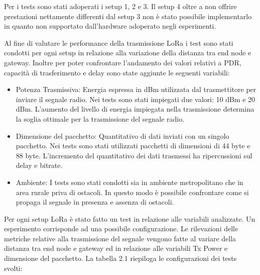 \documentclass[12pt,a4paper,openright,twoside]{report}
\begin{document}
Per i tests sono stati adoperati i setup 1, 2 e 3. Il setup 4 oltre a non offrire prestazioni nettamente differenti dal setup 3 non \`e stato possibile implementarlo in quanto non supportato dall'hardware adoperato negli esperimenti.  

Al fine di valutare le performance della trasmissione LoRa i test sono stati condotti per ogni setup in relazione alla variazione della distanza tra end node e gateway. Inoltre per poter confrontare l'andamento dei valori relativi a PDR, capacit\`a di trasferimento e delay sono state aggiunte le seguenti variabili:   
\begin{itemize}   
\item Potenza Trasmissiva: Energia espressa in dBm utilizzata dal trasmettitore per inviare il segnale radio. Nei tests sono stati impiegati due valori: 10 dBm e 20 dBm. L'aumento del livello di energia impiegata nella trasmissione determina la soglia ottimale per la trasmissione del segnale radio.     
\item Dimensione del pacchetto: Quantitativo di dati inviati con un singolo pacchetto. Nei tests sono stati utilizzati pacchetti di dimensioni di 44 byte e 88 byte. L'incremento del quantitativo dei dati trasmessi ha ripercussioni sul delay e bitrate.   
\item Ambiente: I tests sono stati condotti sia in ambiente metropolitano che in area rurale priva di ostacoli. In questo modo \`e possibile confrontare come si propaga il segnale in presenza e assenza di ostacoli. 
\end{itemize}

Per ogni setup LoRa \`e stato fatto un test in relazione alle variabili analizzate.
Un esperimento corrisponde ad una possibile configurazione. Le rilevazioni delle metriche relative alla trasmissione del segnale vengono fatte al variare della distanza tra end node e gateway ed in relazione alle variabili Tx Power e dimensione del pacchetto. 
La tabella 2.1 riepiloga le configurazioni dei tests svolti:
\end{document}
